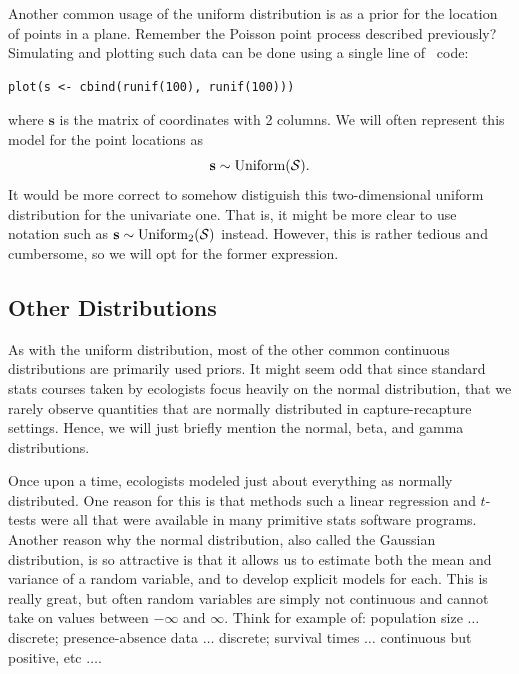 Another common usage of the uniform distribution is as a prior for the
location of points in a plane. Remember the Poisson point process
described previously? Simulating and plotting such data can be done
using a single line of \R~code:
\begin{verbatim}
plot(s <- cbind(runif(100), runif(100)))
\end{verbatim}
where $\mathbf{s}$ is the matrix of coordinates with 2 columns. We
will often represent this model for the point locations as
\begin{equation}
  {\bf s} \sim \text{Uniform}(\mathcal{S}).
\end{equation}
It would be more correct to somehow distiguish this
two-dimensional uniform distribution for the univariate one. That is,
it might be more clear to use notation such as
${\bf s} \sim \text{Uniform}_2(\mathcal{S})$ instead. However, this is rather
tedious and cumbersome, so we will opt for the former expression.




\subsection{Other Distributions}


As with the uniform distribution, most of the other common continuous
distributions are primarily used priors. It might seem odd that since
standard stats courses taken by ecologists focus heavily on the normal
distribution, that we rarely observe quantities that are normally
distributed in capture-recapture settings. Hence, we will just briefly
mention the normal, beta, and gamma distributions.

Once upon a time, ecologists modeled just about everything as normally
distributed. One reason for this is that methods such a linear
regression and $t$-tests were all that were available in many
primitive stats software programs. Another reason why the normal
distribution, also called the Gaussian distribution, is so attractive
is that it allows us to estimate both the mean and variance of a
random variable, and to develop explicit models for each. This is really
great, but often random variables are simply not continuous and cannot
take on values between $-\infty$ and $\infty$. Think for example of:
population size $\dots$ discrete; presence-absence data $\dots$ discrete;
survival times $\dots$ continuous but positive, etc $\dots$.

